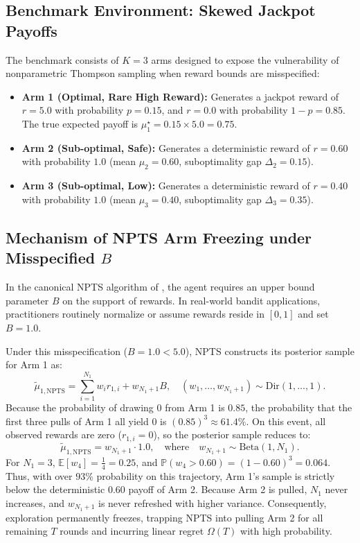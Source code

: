 \documentclass[twoside]{article}
\begin{document}
\subsection{Benchmark Environment: Skewed Jackpot Payoffs}
The benchmark consists of $K = 3$ arms designed to expose the vulnerability of nonparametric Thompson sampling when reward bounds are misspecified:
\begin{itemize}
    \item \textbf{Arm 1 (Optimal, Rare High Reward):} Generates a jackpot reward of $r = 5.0$ with probability $p = 0.15$, and $r = 0.0$ with probability $1 - p = 0.85$. The true expected payoff is $\mu_1^\star = 0.15 \times 5.0 = 0.75$.
    \item \textbf{Arm 2 (Sub-optimal, Safe):} Generates a deterministic reward of $r = 0.60$ with probability $1.0$ (mean $\mu_2 = 0.60$, suboptimality gap $\Delta_2 = 0.15$).
    \item \textbf{Arm 3 (Sub-optimal, Low):} Generates a deterministic reward of $r = 0.40$ with probability $1.0$ (mean $\mu_3 = 0.40$, suboptimality gap $\Delta_3 = 0.35$).
\end{itemize}

\subsection{Mechanism of NPTS Arm Freezing under Misspecified $B$}
In the canonical NPTS algorithm of \citet{riou2020bandit}, the agent requires an upper bound parameter $B$ on the support of rewards. In real-world bandit applications, practitioners routinely normalize or assume rewards reside in $[0, 1]$ and set $B = 1.0$.

Under this misspecification ($B = 1.0 < 5.0$), NPTS constructs its posterior sample for Arm 1 as:
\begin{equation}
\tilde{\mu}_{1, \text{NPTS}} = \sum_{i=1}^{N_1} w_i r_{1, i} + w_{N_1+1} B, \quad (w_1, \dots, w_{N_1+1}) \sim \text{Dir}(1, \dots, 1).
\end{equation}
Because the probability of drawing $0$ from Arm 1 is $0.85$, the probability that the first three pulls of Arm 1 all yield $0$ is $(0.85)^3 \approx 61.4\%$. On this event, all observed rewards are zero ($r_{1, i} = 0$), so the posterior sample reduces to:
\begin{equation}
\tilde{\mu}_{1, \text{NPTS}} = w_{N_1+1} \cdot 1.0, \quad \text{where} \quad w_{N_1+1} \sim \text{Beta}(1, N_1).
\end{equation}
For $N_1 = 3$, $\mathbb{E}[w_4] = \frac{1}{4} = 0.25$, and $\mathbb{P}(w_4 > 0.60) = (1 - 0.60)^3 = 0.064$. Thus, with over $93\%$ probability on this trajectory, Arm 1's sample is strictly below the deterministic $0.60$ payoff of Arm 2. Because Arm 2 is pulled, $N_1$ never increases, and $w_{N_1+1}$ is never refreshed with higher variance. Consequently, exploration permanently freezes, trapping NPTS into pulling Arm 2 for all remaining $T$ rounds and incurring linear regret $\Omega(T)$ with high probability.
\end{document}
